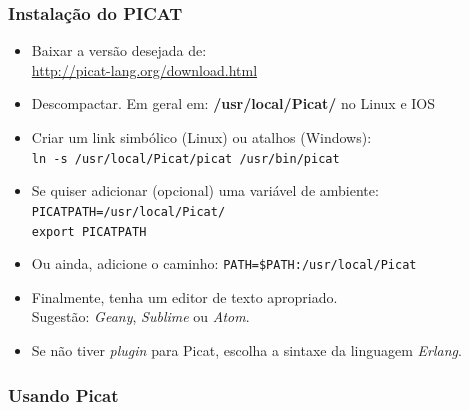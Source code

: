 \begin{frame}[fragile]
  \frametitle{Instalação do PICAT}

  \begin{itemize}
  
  	\item Baixar a versão desejada de:\\ 
    \hspace{8mm} \url{http://picat-lang.org/download.html}

     \pause    
   	\item Descompactar. Em geral em: \textbf{/usr/local/Picat/} no Linux e IOS

     \pause    
    \item  Criar um link simbólico (Linux) ou atalhos (Windows):\\ 
    
   	\hspace{8mm}\texttt{ln -s /usr/local/Picat/picat   \hspace{3mm}   /usr/bin/picat}

    \pause    
    \item Se quiser adicionar (opcional) uma variável de ambiente:\\
          \hspace{8mm} \texttt{PICATPATH=/usr/local/Picat/}\\
          \hspace{8mm} \texttt{export PICATPATH}

     \pause
    \item Ou ainda, adicione o caminho: \texttt{PATH=\$PATH:/usr/local/Picat}

     \pause
   	\item Finalmente, tenha um editor de texto apropriado.\\
    \hspace{8mm} Sugestão: \textit{Geany}, \textit{Sublime} ou \textit{Atom}.
     
    \pause
    \item Se não tiver \textit{plugin} para Picat, escolha a sintaxe da linguagem \textit{Erlang}.
    
  \end{itemize}

\end{frame}


\subsubsection{Usando Picat}

